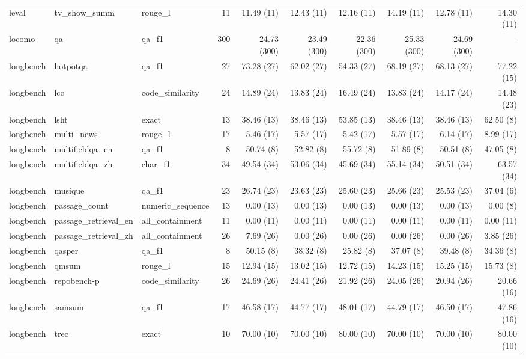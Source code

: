 \begin{landscape}
\begin{longtable}{@{}p{19mm}p{52mm}p{25mm}rrrrrrr@{}}
leval & tv\_show\_summ & rouge\_l & 11 & 11.49 (11) & 12.43 (11) & 12.16 (11) & 14.19 (11) & 12.78 (11) & 14.30 (11) \\
locomo & qa & qa\_f1 & 300 & 24.73 (300) & 23.49 (300) & 22.36 (300) & 25.33 (300) & 24.69 (300) & - \\
longbench & hotpotqa & qa\_f1 & 27 & 73.28 (27) & 62.02 (27) & 54.33 (27) & 68.19 (27) & 68.13 (27) & 77.22 (15) \\
longbench & lcc & code\_similarity & 24 & 14.89 (24) & 13.83 (24) & 16.49 (24) & 13.83 (24) & 14.17 (24) & 14.48 (23) \\
longbench & lsht & exact & 13 & 38.46 (13) & 38.46 (13) & 53.85 (13) & 38.46 (13) & 38.46 (13) & 62.50 (8) \\
longbench & multi\_news & rouge\_l & 17 & 5.46 (17) & 5.57 (17) & 5.42 (17) & 5.57 (17) & 6.14 (17) & 8.99 (17) \\
longbench & multifieldqa\_en & qa\_f1 & 8 & 50.74 (8) & 52.82 (8) & 55.72 (8) & 51.89 (8) & 50.51 (8) & 47.05 (8) \\
longbench & multifieldqa\_zh & char\_f1 & 34 & 49.54 (34) & 53.06 (34) & 45.69 (34) & 55.14 (34) & 50.51 (34) & 63.57 (34) \\
longbench & musique & qa\_f1 & 23 & 26.74 (23) & 23.63 (23) & 25.60 (23) & 25.66 (23) & 25.53 (23) & 37.04 (6) \\
longbench & passage\_count & numeric\_sequence & 13 & 0.00 (13) & 0.00 (13) & 0.00 (13) & 0.00 (13) & 0.00 (13) & 0.00 (8) \\
longbench & passage\_retrieval\_en & all\_containment & 11 & 0.00 (11) & 0.00 (11) & 0.00 (11) & 0.00 (11) & 0.00 (11) & 0.00 (11) \\
longbench & passage\_retrieval\_zh & all\_containment & 26 & 7.69 (26) & 0.00 (26) & 0.00 (26) & 0.00 (26) & 0.00 (26) & 3.85 (26) \\
longbench & qasper & qa\_f1 & 8 & 50.15 (8) & 38.32 (8) & 25.82 (8) & 37.07 (8) & 39.48 (8) & 34.36 (8) \\
longbench & qmsum & rouge\_l & 15 & 12.94 (15) & 13.02 (15) & 12.72 (15) & 14.23 (15) & 15.25 (15) & 15.73 (8) \\
longbench & repobench-p & code\_similarity & 26 & 24.69 (26) & 24.41 (26) & 21.92 (26) & 24.05 (26) & 20.94 (26) & 20.66 (16) \\
longbench & samsum & qa\_f1 & 17 & 46.58 (17) & 44.77 (17) & 48.01 (17) & 44.79 (17) & 46.50 (17) & 47.86 (16) \\
longbench & trec & exact & 10 & 70.00 (10) & 70.00 (10) & 80.00 (10) & 70.00 (10) & 70.00 (10) & 80.00 (10) \\

\end{longtable}
\end{landscape}
